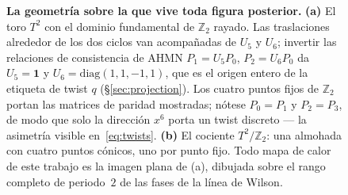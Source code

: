 \documentclass[11pt,a4paper]{article}
\newcommand{\ZZ}{\mathbb{Z}}
\begin{document}
\begin{figure}[t]
\caption{\textbf{La geometría sobre la que vive toda figura posterior.} \textbf{(a)} El toro
$T^2$ con el dominio fundamental de $\ZZ_2$ rayado. Las traslaciones alrededor de los dos
ciclos van acompañadas de $U_5$ y $U_6$; invertir las relaciones de consistencia de AHMN
$P_1=U_5P_0$, $P_2=U_6P_0$ da $U_5=\mathbf{1}$ y $U_6=\mathrm{diag}(1,1,-1,1)$, que es el
origen entero de la etiqueta de twist $q$ (\S\ref{sec:projection}). Los cuatro puntos fijos de
$\ZZ_2$ portan las matrices de paridad mostradas; nótese $P_0=P_1$ y $P_2=P_3$, de modo que
solo la dirección $x^6$ porta un twist discreto --- la asimetría visible
en~\eqref{eq:twists}. \textbf{(b)} El cociente $T^2/\ZZ_2$: una almohada con cuatro puntos
cónicos, uno por punto fijo. Todo mapa de calor de este trabajo es la imagen plana de (a),
dibujada sobre el rango completo de periodo~$2$ de las fases de la línea de Wilson.}
\label{fig:fundamental}
\end{figure}
\end{document}
